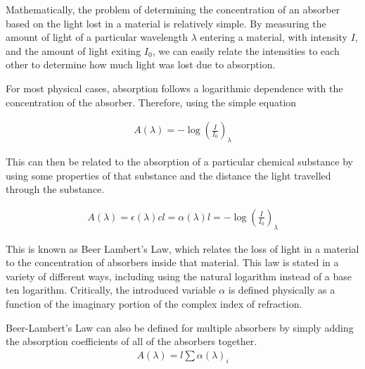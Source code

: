 Mathematically, the problem of determining the concentration of an absorber
based on the light lost in a material is relatively simple. By measuring the
amount of light of a particular wavelength $\lambda$ entering a material, with
intensity $I$, and the amount of light exiting $I_0$, we can easily relate
the intensities to each other to determine how much light was lost due to
absorption.

For most physical cases, absorption follows a logarithmic dependence
with the concentration of the absorber. Therefore, using the simple
equation

\begin{align*}
  A(\lambda)=-\log\left(\frac{I}{I_0}\right)_\lambda
\end{align*}

This can then be related to the absorption of a particular chemical substance
by using some properties of that substance and the distance the light
travelled through the substance.

\begin{align}
  A(\lambda) = \epsilon(\lambda) c l = \alpha(\lambda) l = -\log\left(\frac{I}{I_0}\right)_\lambda
\end{align}

This is known as Beer Lambert's Law, which relates the loss of light in a
material to the concentration of absorbers inside that material.  This law is
stated in a variety of different ways, including using the natural logarithm
instead of a base ten logarithm. Critically, the introduced variable $\alpha$ is defined physically
as a function of the imaginary portion of the complex index of refraction.

Beer-Lambert's Law can also be defined for multiple absorbers by simply adding the absorption coefficients of all of the absorbers together.
\begin{align*}
  A(\lambda) = l\sum\alpha(\lambda)_i
\end{align*}

